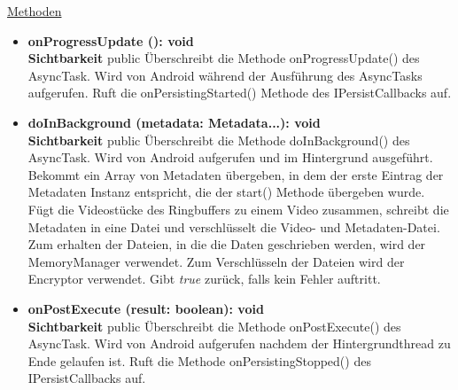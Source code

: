 \underline{Methoden}
\begin{itemize}
\itemsep0pt

\item \textbf{onProgressUpdate (): void}\hfill\\
\textbf{Sichtbarkeit} public\newline
Überschreibt die Methode onProgressUpdate() des AsyncTask. Wird von Android während der Ausführung des AsyncTasks aufgerufen. Ruft die onPersistingStarted() Methode des IPersistCallbacks auf.

\item \textbf{doInBackground (metadata: Metadata...): void}\hfill\\
\textbf{Sichtbarkeit} public\newline
Überschreibt die Methode doInBackground() des AsyncTask. Wird von Android aufgerufen und im Hintergrund ausgeführt. Bekommt ein Array von Metadaten übergeben, in dem der erste Eintrag der Metadaten Instanz entspricht, die der start() Methode übergeben wurde. Fügt die Videostücke des Ringbuffers zu einem Video zusammen, schreibt die Metadaten in eine Datei und verschlüsselt die Video- und Metadaten-Datei. Zum erhalten der Dateien, in die die Daten geschrieben werden, wird der MemoryManager verwendet. Zum Verschlüsseln der Dateien wird der Encryptor verwendet. Gibt \textit{true} zurück, falls kein Fehler auftritt.

\item \textbf{onPostExecute (result: boolean): void}\hfill\\
\textbf{Sichtbarkeit} public\newline
Überschreibt die Methode onPostExecute() des AsyncTask. Wird von Android aufgerufen nachdem der Hintergrundthread zu Ende gelaufen ist. Ruft die Methode onPersistingStopped() des IPersistCallbacks auf.

\end{itemize}